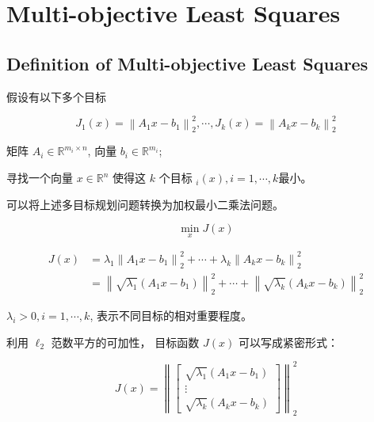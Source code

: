 \chapter{Multi-objective Least Squares}

\section{Definition of Multi-objective Least Squares}

\begin{problem}
    假设有以下多个目标

\begin{equation}
J_{1}(x)=\left\|A_{1} x-b_{1}\right\|_{2}^{2}, \cdots, J_{k}(x)=\left\|A_{k} x-b_{k}\right\|_{2}^{2}
\end{equation}

矩阵 $ A_{i} \in \mathbb{R}^{m_{i} \times n} $, 向量 $ b_{i} \in \mathbb{R}^{m_{i}} $;

寻找一个向量 $ x \in \mathbb{R}^{n} $ 使得这 $ k $ 个目标 $ _{i}(x), i=1, \cdots, k $最小。
\end{problem}

可以将上述多目标规划问题转换为加权最小二乘法问题。

\begin{problem}[加权最小二乘法问题]
    \begin{equation} 
    \min _{x} J(x)
\end{equation}

\begin{equation}\begin{aligned}
    J(x)&=\lambda_{1}\left\|A_{1} x-b_{1}\right\|_{2}^{2}+\cdots+\lambda_{k}\left\|A_{k} x-b_{k}\right\|_{2}^{2} \\
    &=\left\|\sqrt{\lambda_{1}}\left(A_{1} x-b_{1}\right)\right\|_{2}^{2}+\cdots+\left\|\sqrt{\lambda_{k}}\left(A_{k} x-b_{k}\right)\right\|_{2}^{2}
    \end{aligned}\end{equation}

$ \lambda_{i}>0, i=1, \cdots, k $, 表示不同目标的相对重要程度。
\end{problem}

利用 $ \ell_{2} $ 范数平方的可加性， 目标函数 $ J(x) $ 可以写成紧密形式：

\begin{problem}[加权最小二乘法问题紧密形式]
    \begin{equation}
J(x)=\left\|\left[\begin{array}{c}
\sqrt{\lambda_{1}}\left(A_{1} x-b_{1}\right) \\
\vdots \\
\sqrt{\lambda_{k}}\left(A_{k} x-b_{k}\right)
\end{array}\right]\right\|_{2}^{2}
\end{equation}
\end{problem}



